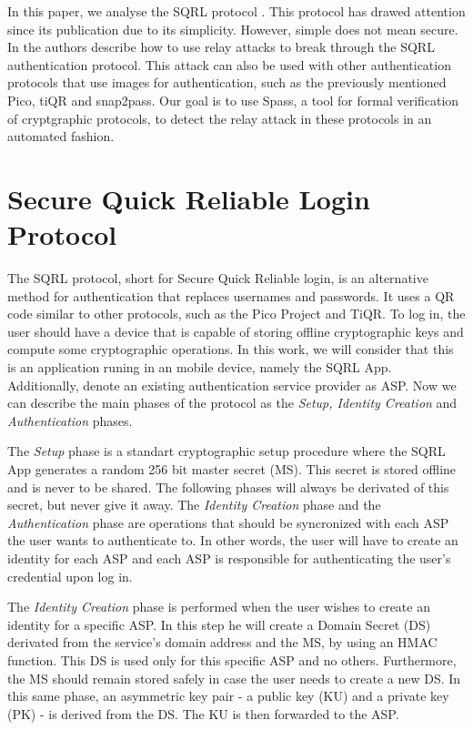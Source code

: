 \documentclass{article}
\begin{document}
	In this paper, we analyse the SQRL protocol \cite{sqrl}. This protocol
	has drawed attention since its publication due to its simplicity. However,
	simple does not mean secure. In \cite{relayattack} the authors
	describe how to use relay attacks to break through the SQRL authentication
	protocol. This attack can also be used with other authentication
	protocols that use images for authentication, such as the previously mentioned
	Pico, tiQR and snap2pass.
	Our goal is to use Spass, a tool for formal verification of cryptgraphic
	protocols, to detect the relay attack in these protocols in an automated fashion.

\section{Secure Quick Reliable Login Protocol}

	The SQRL protocol, short for Secure Quick Reliable login, is an alternative method 
	for authentication that replaces usernames and passwords. It uses a QR code
	similar to other protocols, such as the Pico Project and TiQR. To log in,
	the user should have a device that is capable of storing offline cryptographic
	keys and compute some cryptographic operations. In this work, we will consider that
	this is an application runing in an mobile device, namely the SQRL App. 
	Additionally, denote an existing authentication service provider as ASP. Now
	we can describe the main phases of the protocol as the \emph{Setup, Identity 
	Creation} and \emph{Authentication} phases.

	The \emph{Setup} phase is a standart cryptographic setup procedure where the
	SQRL App generates a random 256 bit master secret (MS). This secret is stored 
	offline and 
	is never to be shared. The following phases will always be derivated of this
	secret, but never give it away. The \emph{Identity Creation} phase and the
	\emph{Authentication} phase are operations that should be syncronized with
	each ASP the user wants to authenticate to. In other words, the user will
	have to create an identity for each ASP and each ASP is responsible 
	for authenticating the user's credential upon log in.

	The \emph{Identity Creation} phase is performed when the user wishes to create an
	identity for a specific ASP. In this step he will create a Domain Secret (DS)
	derivated from the service's domain address and the MS, by using an HMAC function.
	This DS is used only for this specific ASP and no others. Furthermore, the
	MS should remain stored safely in case the user needs to create a new DS. In 
	this same phase, an asymmetric key pair - a public key (KU) and a private key (PK) -
	is derived from the	DS. The KU is then forwarded to the ASP.
\end{document}
